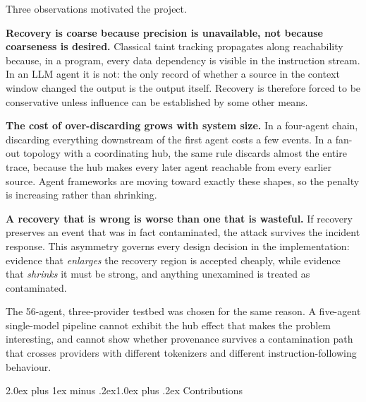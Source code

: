 \documentclass[10pt,twocolumn,a4paper]{article}
\makeatletter
\renewcommand{\subsection}{\@startsection{subsection}{2}{\z@}%
  {2.0ex plus 1ex minus .2ex}{1.0ex plus .2ex}%
  {\normalfont\normalsize\itshape}}
\makeatother
\begin{document}
Three observations motivated the project.

\textbf{Recovery is coarse because precision is unavailable, not because
coarseness is desired.} Classical taint tracking propagates along
reachability~\cite{newsome2005,king2003} because, in a program, every data
dependency is visible in the instruction stream. In an LLM agent it is not: the
only record of whether a source in the context window changed the output is the
output itself. Recovery is therefore forced to be conservative unless influence
can be established by some other means.

\textbf{The cost of over-discarding grows with system size.} In a four-agent
chain, discarding everything downstream of the first agent costs a few events.
In a fan-out topology with a coordinating hub, the same rule discards almost the
entire trace, because the hub makes every later agent reachable from every
earlier source. Agent frameworks are moving toward exactly these shapes, so the
penalty is increasing rather than shrinking.

\textbf{A recovery that is wrong is worse than one that is wasteful.} If
recovery preserves an event that was in fact contaminated, the attack survives
the incident response. This asymmetry governs every design decision in the
implementation: evidence that \emph{enlarges} the recovery region is accepted
cheaply, while evidence that \emph{shrinks} it must be strong, and anything
unexamined is treated as contaminated.

The 56-agent, three-provider testbed was chosen for the same reason. A
five-agent single-model pipeline cannot exhibit the hub effect that makes the
problem interesting, and cannot show whether provenance survives a contamination
path that crosses providers with different tokenizers and different
instruction-following behaviour.

\subsection{Contributions}
\end{document}
